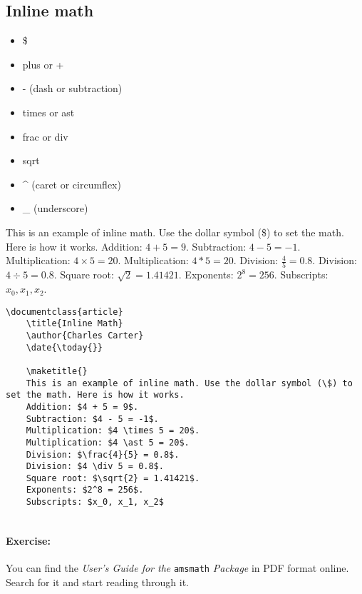         \subsection{Inline math}
        \label{Inline-math}
        
        \begin{framed}
            \begin{itemize}
                \item{\$}
                \item{plus or +}
				\item{- (dash or subtraction)}
                \item{times or ast}
                \item{frac or div}
                \item{sqrt}
				\item{\^{} (caret or circumflex)}
				\item{\_ (underscore)} 
            \end{itemize}
        \end{framed}

	This is an example of inline math. Use the dollar symbol (\$) to set the math. Here is how it works.  Addition: $4 + 5 = 9$.  Subtraction: $4 - 5 = -1$.  Multiplication: $4 \times 5 = 20$.  Multiplication: $4 \ast 5 = 20$.  Division: $\frac{4}{5} = 0.8$.  Division: $4 \div 5 = 0.8$.  Square root: $\sqrt{2} = 1.41421$.  Exponents: $2^8 = 256$.  Subscripts: $x_0, x_1, x_2$.

        \begin{verbatim}
\documentclass{article}
    \title{Inline Math}
    \author{Charles Carter}
    \date{\today{}}
 
    \maketitle{}
	This is an example of inline math. Use the dollar symbol (\$) to set the math. Here is how it works. 
    Addition: $4 + 5 = 9$. 
    Subtraction: $4 - 5 = -1$. 
    Multiplication: $4 \times 5 = 20$. 
    Multiplication: $4 \ast 5 = 20$.
    Division: $\frac{4}{5} = 0.8$. 
    Division: $4 \div 5 = 0.8$. 
    Square root: $\sqrt{2} = 1.41421$. 
    Exponents: $2^8 = 256$.
	Subscripts: $x_0, x_1, x_2$
	    
		\end{verbatim}

		\paragraph{Exercise:}You can find the \textit{User's Guide for the }\texttt{amsmath} \textit{Package} in PDF format online. Search for it and start reading through it.

